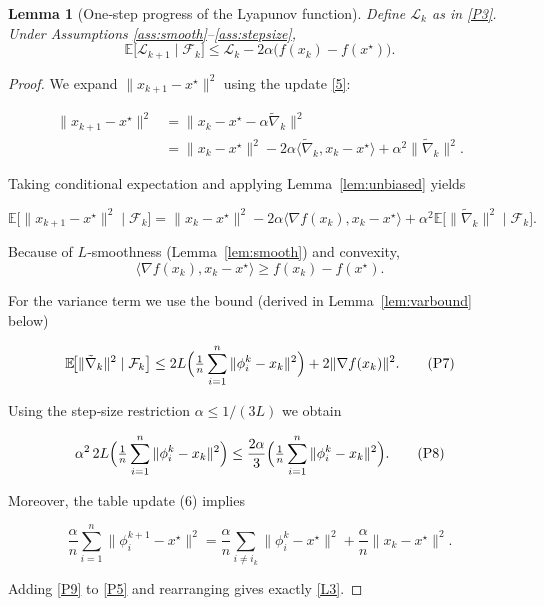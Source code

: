 \documentclass{article}
\newtheorem{lemma}{Lemma}
\newcommand{\E}{\mathbb{E}}
\newcommand{\grad}{\nabla}
\newcommand{\inner}[2]{\langle #1,#2\rangle}
\begin{document}
\begin{lemma}[One‑step progress of the Lyapunov function]\label{lem:lyapunov}
Define $\mathcal{L}_k$ as in \eqref{P3}. Under Assumptions \ref{ass:smooth}–\ref{ass:stepsize},
\[
\E\!\bigl[\mathcal{L}_{k+1}\mid\mathcal{F}_k\bigr]
\le \mathcal{L}_k-2\alpha\bigl(f(x_k)-f(x^\star)\bigr).
\tag{L3}
\]
\end{lemma}
\begin{proof}
We expand $\|x_{k+1}-x^\star\|^2$ using the update \eqref{5}:

\[
\begin{aligned}
\|x_{k+1}-x^\star\|^2
&=\|x_k-x^\star-\alpha\tilde\nabla_k\|^2 \\
&=\|x_k-x^\star\|^2-2\alpha\inner{\tilde\nabla_k}{x_k-x^\star}
+\alpha^2\|\tilde\nabla_k\|^2 .
\end{aligned}
\tag{P4}
\]

Taking conditional expectation and applying Lemma~\ref{lem:unbiased} yields  

\[
\E\!\bigl[\|x_{k+1}-x^\star\|^2\mid\mathcal{F}_k\bigr]
= \|x_k-x^\star\|^2-2\alpha\inner{\grad f(x_k)}{x_k-x^\star}
+\alpha^2\E\!\bigl[\|\tilde\nabla_k\|^2\mid\mathcal{F}_k\bigr].
\tag{P5}
\]

Because of $L$‑smoothness (Lemma~\ref{lem:smooth}) and convexity,
\[
\inner{\grad f(x_k)}{x_k-x^\star}\ge f(x_k)-f(x^\star).
\tag{P6}
\]

For the variance term we use the bound (derived in Lemma~\ref{lem:varbound} below)

\[
\E\!\bigl[\|\tilde\nabla_k\|^2\mid\mathcal{F}_k\bigr]
\le 2L\Bigl(\tfrac1n\sum_{i=1}^{n}\|\phi_i^k-x_k\|^2\Bigr)+2\|\grad f(x_k)\|^2 .
\tag{P7}
\]

Using the step‑size restriction $\alpha\le 1/(3L)$ we obtain  

\[
\alpha^2\,2L\Bigl(\tfrac1n\sum_{i=1}^{n}\|\phi_i^k-x_k\|^2\Bigr)
\le \frac{2\alpha}{3}\Bigl(\tfrac1n\sum_{i=1}^{n}\|\phi_i^k-x_k\|^2\Bigr).
\tag{P8}
\]

Moreover, the table update (6) implies  

\[
\frac{\alpha}{n}\sum_{i=1}^{n}\|\phi_i^{k+1}-x^\star\|^2
= \frac{\alpha}{n}\sum_{i\neq i_k}\|\phi_i^{k}-x^\star\|^2
+ \frac{\alpha}{n}\|x_k-x^\star\|^2 .
\tag{P9}
\]

Adding \eqref{P9} to \eqref{P5} and rearranging gives exactly \eqref{L3}.
\qedhere
\end{proof}
\end{document}
